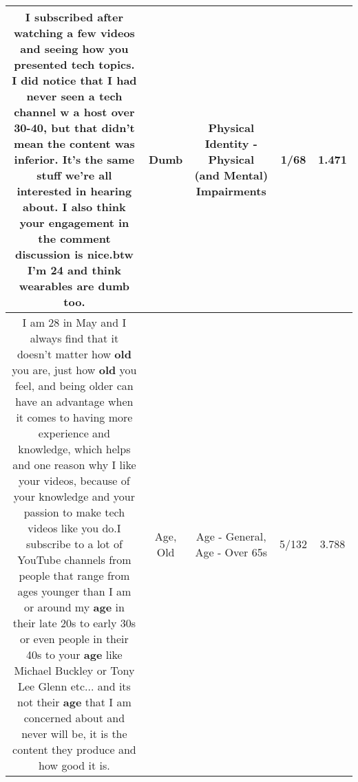 \documentclass[11pt]{article}
\newlength\mylength
\begin{document}
\begin{center}
\begin{longtable}{|C{.65\mylength}|C{.30\mylength}|C{.12\mylength}|C{.12\mylength}|C{.12\mylength}|}
  \small I subscribed after watching a few videos and seeing how you presented tech topics.  I did notice that I had never seen a tech channel w a host over 30-40, but that didn't mean the content was inferior.  It's the same stuff we're all interested in hearing about. I also think your engagement in the comment discussion is nice.btw I'm 24 and think wearables are \textbf{dumb} too.\normalsize   & Dumb & Physical Identity - Physical (and Mental) Impairments & 1/68 & 1.471 \\  \hline
  \small I am 28 in May and I always find that it doesn't matter how \textbf{old} you are, just how \textbf{old} you feel, and being older can have an advantage when it comes to having more experience and knowledge, which helps and one reason why I like your videos,  because of your knowledge and your passion to make tech videos like you do.I subscribe to a lot of YouTube channels from people that range from ages younger than I am or around my \textbf{age} in their late 20s to early 30s or even people in their 40s to your \textbf{age} like Michael Buckley or Tony Lee Glenn etc... and its not their \textbf{age} that I am concerned about and never will be, it is the content they produce and how good it is.\normalsize   & Age, Old & Age - General, Age - Over 65s & 5/132 & 3.788 \\  \hline

\end{longtable}
\end{center}
\end{document}
